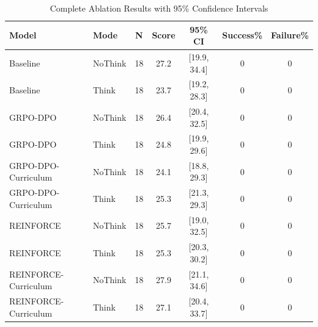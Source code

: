\begin{table}[ht]
\centering
\caption{Complete Ablation Results with 95\% Confidence Intervals}
\label{tab:ablation}
\begin{tabular}{llccccc}
\toprule
Model & Mode & N & Score & 95\% CI & Success\% & Failure\% \\
\midrule
Baseline & NoThink & 18 & 27.2 & [19.9, 34.4] & 0 & 0 \\
Baseline & Think & 18 & 23.7 & [19.2, 28.3] & 0 & 0 \\
GRPO-DPO & NoThink & 18 & 26.4 & [20.4, 32.5] & 0 & 0 \\
GRPO-DPO & Think & 18 & 24.8 & [19.9, 29.6] & 0 & 0 \\
GRPO-DPO-Curriculum & NoThink & 18 & 24.1 & [18.8, 29.3] & 0 & 0 \\
GRPO-DPO-Curriculum & Think & 18 & 25.3 & [21.3, 29.3] & 0 & 0 \\
REINFORCE & NoThink & 18 & 25.7 & [19.0, 32.5] & 0 & 0 \\
REINFORCE & Think & 18 & 25.3 & [20.3, 30.2] & 0 & 0 \\
REINFORCE-Curriculum & NoThink & 18 & 27.9 & [21.1, 34.6] & 0 & 0 \\
REINFORCE-Curriculum & Think & 18 & 27.1 & [20.4, 33.7] & 0 & 0 \\
\bottomrule
\end{tabular}
\end{table}
